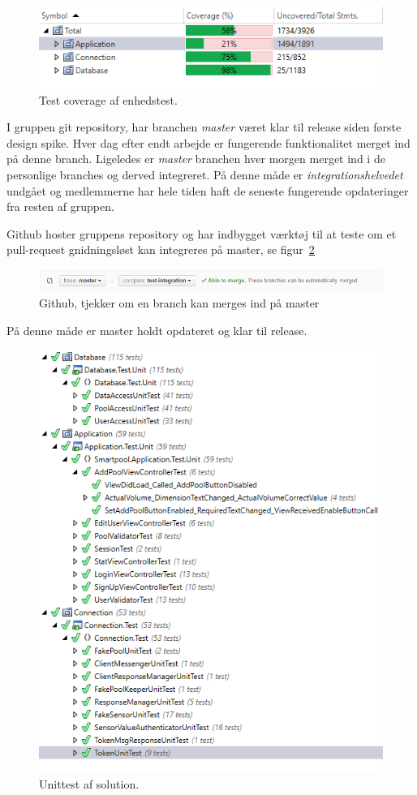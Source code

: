 \begin{figure}[h]
	\centering
	\includegraphics[width=0.8\linewidth]{figs/test/coverage}
	\caption{Test coverage af enhedstest.}
	\label{fig:coverage}
\end{figure}

I gruppen git repository, har branchen \textit{master} været klar til release siden første design spike. Hver dag efter endt arbejde er fungerende funktionalitet merget ind på denne branch. Ligeledes er \textit{master} branchen hver morgen merget ind i de personlige branches og derved integreret. På denne måde er \textit{integrationshelvedet} undgået og medlemmerne har hele tiden haft de seneste fungerende opdateringer fra resten af gruppen.

Github hoster gruppens repository og har indbygget værktøj til at teste om et pull-request gnidningsløst kan integreres på master, se figur~\ref{fig:gitmerge}

\begin{figure}[h]
\centering
\includegraphics[width=\linewidth]{figs/test/gitmerge.png}
\caption{Github, tjekker om en branch kan merges ind på master}
\label{fig:gitmerge}
\end{figure}

På denne måde er master holdt opdateret og klar til release.

\begin{figure}[h]
	\centering
	\includegraphics[width=0.7\linewidth]{figs/test/vsUnittest}
	\caption{Unittest af solution.}
	\label{fig:coverage}
\end{figure}




